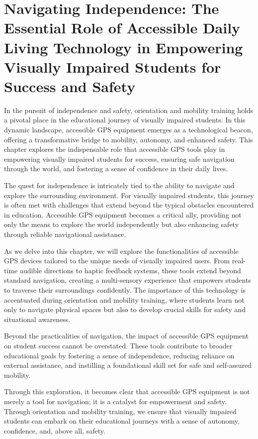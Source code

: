 \chapter{Navigating Independence: The Essential Role of Accessible Daily Living Technology in Empowering Visually Impaired Students for Success and Safety}\label{accessible-gps-mapping}

In the pursuit of independence and safety, orientation and mobility training holds a pivotal place in the educational journey of visually impaired students. In this dynamic landscape, accessible GPS equipment emerges as a technological beacon, offering a transformative bridge to mobility, autonomy, and enhanced safety. This chapter explores the indispensable role that accessible GPS tools play in empowering visually impaired students for success, ensuring safe navigation through the world, and fostering a sense of confidence in their daily lives.

The quest for independence is intricately tied to the ability to navigate and explore the surrounding environment. For visually impaired students, this journey is often met with challenges that extend beyond the typical obstacles encountered in education. Accessible GPS equipment becomes a critical ally, providing not only the means to explore the world independently but also enhancing safety through reliable navigational assistance.

As we delve into this chapter, we will explore the functionalities of accessible GPS devices tailored to the unique needs of visually impaired users. From real-time audible directions to haptic feedback systems, these tools extend beyond standard navigation, creating a multi-sensory experience that empowers students to traverse their surroundings confidently. The importance of this technology is accentuated during orientation and mobility training, where students learn not only to navigate physical spaces but also to develop crucial skills for safety and situational awareness.

Beyond the practicalities of navigation, the impact of accessible GPS equipment on student success cannot be overstated. These tools contribute to broader educational goals by fostering a sense of independence, reducing reliance on external assistance, and instilling a foundational skill set for safe and self-assured mobility.

Through this exploration, it becomes clear that accessible GPS equipment is not merely a tool for navigation; it is a catalyst for empowerment and safety. Through orientation and mobility training, we ensure that visually impaired students can embark on their educational journeys with a sense of autonomy, confidence, and, above all, safety.

